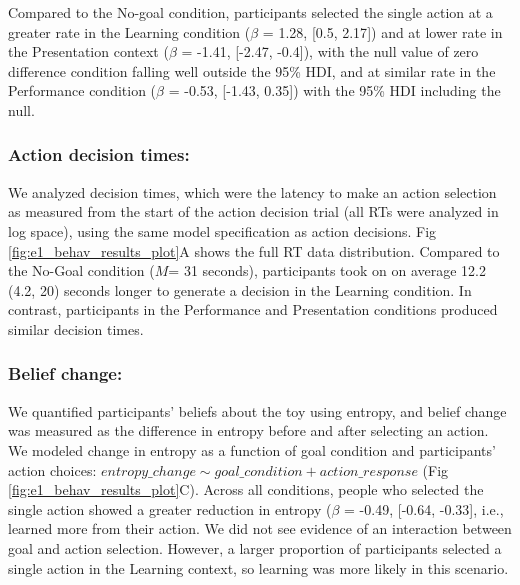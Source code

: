 \documentclass[10pt, letterpaper]{article}
\begin{document}
Compared to the No-goal condition, participants selected the single
action at a greater rate in the Learning condition (\(\beta\) = 1.28,
{[}0.5, 2.17{]}) and at lower rate in the Presentation context
(\(\beta\) = -1.41, {[}-2.47, -0.4{]}), with the null value of zero
difference condition falling well outside the 95\% HDI, and at similar
rate in the Performance condition (\(\beta\) = -0.53, {[}-1.43, 0.35{]})
with the 95\% HDI including the null.

\subsubsection{Action decision times:}\label{action-decision-times}

We analyzed decision times, which were the latency to make an action
selection as measured from the start of the action decision trial (all
RTs were analyzed in log space), using the same model specification as
action decisions. Fig \ref{fig:e1_behav_results_plot}A shows the full RT
data distribution. Compared to the No-Goal condition (\(M\)= 31
seconds), participants took on on average 12.2 (4.2, 20) seconds longer
to generate a decision in the Learning condition. In contrast,
participants in the Performance and Presentation conditions produced
similar decision times.

\subsubsection{Belief change:}\label{belief-change}

We quantified participants' beliefs about the toy using entropy, and
belief change was measured as the difference in entropy before and after
selecting an action. We modeled change in entropy as a function of goal
condition and participants' action choices:
\texttt{$entropy\_change \sim goal\_condition + action\_response$} (Fig
\ref{fig:e1_behav_results_plot}C). Across all conditions, people who
selected the single action showed a greater reduction in entropy
(\(\beta\) = -0.49, {[}-0.64, -0.33{]}, i.e., learned more from their
action. We did not see evidence of an interaction between goal and
action selection. However, a larger proportion of participants selected
a single action in the Learning context, so learning was more likely in
this scenario.
\end{document}
